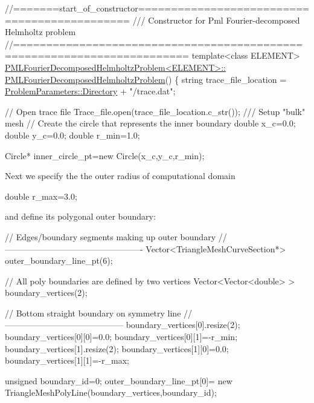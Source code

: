  
\begin{DoxyCodeInclude}
\textcolor{comment}{//=======start\_of\_constructor=============================================}
\textcolor{comment}{/// Constructor for Pml Fourier-decomposed Helmholtz problem}
\textcolor{comment}{}\textcolor{comment}{//========================================================================}
\textcolor{keyword}{template}<\textcolor{keyword}{class} ELEMENT>
\hyperlink{classPMLFourierDecomposedHelmholtzProblem_a5764db8312a28a3e1eaac2cc61813f83}{PMLFourierDecomposedHelmholtzProblem<ELEMENT>::}
\hyperlink{classPMLFourierDecomposedHelmholtzProblem_a5764db8312a28a3e1eaac2cc61813f83}{PMLFourierDecomposedHelmholtzProblem}()
\{
  \textcolor{keywordtype}{string} trace\_file\_location = \hyperlink{namespaceProblemParameters_a9df0f1728e8e7e53dcca84385ae9a031}{ProblemParameters::Directory} + \textcolor{stringliteral}{"/trace.dat"};

 \textcolor{comment}{// Open trace file}
 Trace\_file.open(trace\_file\_location.c\_str());
\textcolor{comment}{}
\textcolor{comment}{ /// Setup "bulk" mesh}
\textcolor{comment}{}
 \textcolor{comment}{// Create the circle that represents the inner boundary}
 \textcolor{keywordtype}{double} x\_c=0.0;
 \textcolor{keywordtype}{double} y\_c=0.0;
 \textcolor{keywordtype}{double} r\_min=1.0;

\end{DoxyCodeInclude}



\begin{DoxyCodeInclude}
 Circle* inner\_circle\_pt=\textcolor{keyword}{new} Circle(x\_c,y\_c,r\_min);

\end{DoxyCodeInclude}


Next we specify the the outer radius of computational domain  
\begin{DoxyCodeInclude}
 \textcolor{keywordtype}{double} r\_max=3.0;

\end{DoxyCodeInclude}


and define its polygonal outer boundary\+:

 
\begin{DoxyCodeInclude}
 \textcolor{comment}{// Edges/boundary segments making up outer boundary}
 \textcolor{comment}{//-------------------------------------------------}
 Vector<TriangleMeshCurveSection*> outer\_boundary\_line\_pt(6);

 \textcolor{comment}{// All poly boundaries are defined by two vertices}
 Vector<Vector<double> > boundary\_vertices(2);


 \textcolor{comment}{// Bottom straight boundary on symmetry line}
 \textcolor{comment}{//------------------------------------------}
 boundary\_vertices[0].resize(2);
 boundary\_vertices[0][0]=0.0;
 boundary\_vertices[0][1]=-r\_min;
 boundary\_vertices[1].resize(2);
 boundary\_vertices[1][0]=0.0;
 boundary\_vertices[1][1]=-r\_max;

 \textcolor{keywordtype}{unsigned} boundary\_id=0;
 outer\_boundary\_line\_pt[0]=
  \textcolor{keyword}{new} TriangleMeshPolyLine(boundary\_vertices,boundary\_id);

\end{DoxyCodeInclude}


